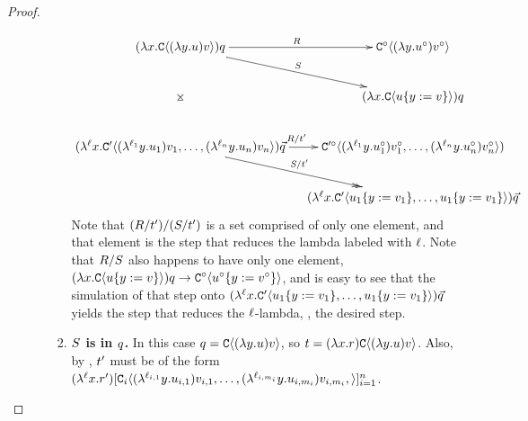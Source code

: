 \begin{proof}
\begin{gonzaenv}
\begin{enumerate}
\begin{enumerate}
\begin{enumerate}
            \[
            \xymatrix@C=0.4cm{
              (\lam{\var}{\conof{(\lam{\vartwo}{\tmthree}) \tmthreevariant}}) \tmsix
                \ar@{->}[r]^{\redex} \ar@{->}[rd]^{\redextwo} \ar@{}[dd]|*=0[@]{\rtimes}
                  & \con^{\circ}\of{(\lam{\vartwo}{\tmthree^{\circ}}) \tmthreevariant^{\circ}} \\
                & (\lam{\var}{\conof{\subs{\tmthree}{\vartwo}{\tmthreevariant}}}) \tmsix \\
              (\lamp{\lab}{\var}{\contwoof{(\lamp{\lab_1}{\vartwo}{\tmthree_1}) \tmthreevariant_1, \hdots, (\lamp{\lab_n}{\vartwo}{\tmthree_n}) \tmthreevariant_n}}) \ls{\tmsix}
                \ar@{->}[r]^{\redex / \tm'} \ar@{->>}[rd]^{\redextwo / \tm'}
                & \con'^{\circ}\of{(\lamp{\lab_1}{\vartwo}{\tmthree^{\circ}_1}) \tmthreevariant^{\circ}_1, \hdots, (\lamp{\lab_n}{\vartwo}{\tmthree^{\circ}_n}) \tmthreevariant^{\circ}_n}) \\
              & (\lamp{\lab}{\var}{\contwoof{\subs{\tmthree_1}{\vartwo}{\tmthreevariant_1}, \hdots, \subs{\tmthree_1}{\vartwo}{\tmthreevariant_1}}}) \ls{\tmsix} \\
            }
            \]
            Note that $(R / t') / (S / t')$ is a set comprised of only one element,
            and that element is the step that reduces the lambda labeled with $\ell$.
            Note that $R / S$ also happens to have only one element,
            $(\lambda x. \mathtt{C}\langle u\{y := v\}\rangle) q \to
              \mathtt{C}^{\circ}\langle u^{\circ}\{y := v^{\circ}\}\rangle$, and is easy to see
            that the simulation of that step onto $(\lambda^{\ell} x. \mathtt{C}'\langle u_1\{y := v_1\}, \hdots, u_1\{y := v_1\}\rangle) \vec{q}$
            yields the step that reduces the $\ell$-lambda, \ie, the desired step.
          \item {\bf $S$ is in $q$.}
            In this case $q = \mathtt{C}\langle(\lambda y. u) v\rangle$,
            so $t = (\lambda x. r) \mathtt{C}\langle(\lambda y. u) v\rangle$.
            Also, by , $t'$ must be of the form
            $(\lambda^{\ell} x. r')
              [\mathtt{C}_i\langle
                (\lambda^{\ell_{i,1}} y. u_{i,1}) v_{i,1},
                \hdots,
                (\lambda^{\ell_{i,m_i}} y. u_{i,m_i}) v_{i,m_i},
              \rangle]_{i=1}^n$.
            \[
\]
\end{enumerate}
\end{enumerate}
\end{enumerate}
\end{gonzaenv}
\end{proof}
